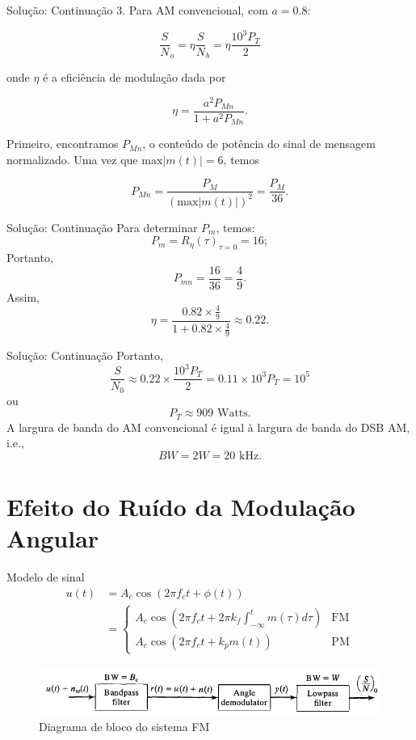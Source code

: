 \documentclass[aspectratio=169,dvipsnames]{beamer}
\begin{document}
\begin{frame}{Solução: Continuação}
    3. Para AM convencional, com \( a = 0.8 \):

\[
\frac{S}{N}_o = \eta \frac{S}{N}_b = \eta \frac{10^3 P_T}{2}
\]

onde \( \eta \) é a eficiência de modulação dada por

\[
\eta = \frac{a^2 P_{Mn}}{1 + a^2 P_{Mn}}.
\]

Primeiro, encontramos \( P_{Mn} \), o conteúdo de potência do sinal de mensagem normalizado. Uma vez que \( \text{max} |m(t)| = 6 \), temos

\[
P_{Mn} = \frac{P_M}{(\text{max} |m(t)|)^2} = \frac{P_M}{36}.
\]

\end{frame}


\begin{frame}{Solução: Continuação}
Para determinar \( P_m \), temos:
\[ P_m = R_\eta (\tau)_{\tau=0} = 16; \]
Portanto,
\[ P_{mn} = \frac{16}{36} = \frac{4}{9}. \]
Assim,
\[ \eta = \frac{0.82 \times \frac{4}{9}}{1 + 0.82 \times \frac{4}{9}} \approx 0.22. \]
\end{frame}


\begin{frame}{Solução: Continuação}
Portanto,
\[ \frac{S}{N_0} \approx 0.22 \times \frac{10^3 P_T}{2} = 0.11 \times 10^3 P_T = 10^5 \]
ou
\[ P_T \approx 909 \text{ Watts}. \]
A largura de banda do AM convencional é igual à largura de banda do DSB AM, i.e.,
\[ BW = 2W = 20 \text{ kHz}. \]
\end{frame}



\section{Efeito do Ruído da Modulação Angular}

\begin{frame}{Modelo de sinal}
    \begin{align*}
u(t) &= A_c \cos(2\pi f_c t + \phi(t)) \\
     &= \left\{ 
         \begin{array}{ll}
         A_c \cos(2\pi f_c t + 2\pi k_f \int_{-\infty}^{t} m(\tau) d\tau) & \text{FM} \\
         A_c \cos(2\pi f_c t + k_p m(t)) & \text{PM}
         \end{array}
    \right.
\end{align*}
\begin{figure}
    \centering
    \includegraphics[width=0.85\linewidth]{Figs/FM/diagrama_bloco_fm.png}
    \caption{Diagrama de bloco do sistema FM}
    \label{fig:efm_ruido}
\end{figure}
\end{frame}
\end{document}
